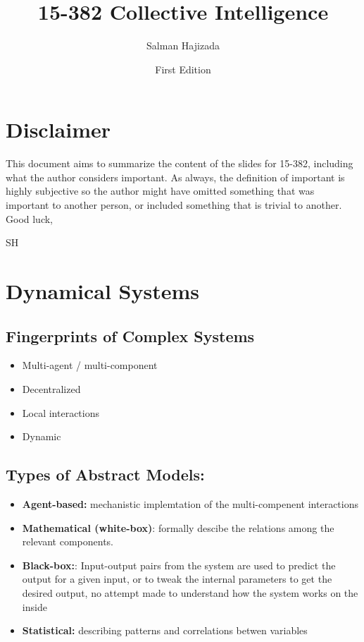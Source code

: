 \documentclass{report}
\title{15-382 Collective Intelligence}
\date{First Edition}
\author{Salman Hajizada}
\begin{document}
\maketitle

\setcounter{chapter}{-1}
\chapter*{Disclaimer}
This document aims to summarize the content of the slides for 15-382, including 
what the author considers important. As always, the definition of important is 
highly subjective so the author might have omitted something that was 
important to another person, or included something that is trivial to another.
\\

Good luck,

SH
\chapter*{Dynamical Systems}

\section*{Fingerprints of Complex Systems}

\begin{itemize}
    \item Multi-agent / multi-component 
    \item Decentralized 
    \item Local interactions 
    \item Dynamic
\end{itemize}

\section*{Types of Abstract Models:}

\begin{itemize}
    \item \textbf{Agent-based:} mechanistic implemtation of the multi-compenent interactions
    \item \textbf{Mathematical (white-box)}: formally descibe the relations among the relevant components. 
    \item \textbf{Black-box:}: Input-output pairs from the system are used to predict the output for a given input, or to tweak the internal parameters to get the desired output, no attempt made to understand how the system works on the inside
    \item \textbf{Statistical:} describing patterns and correlations betwen variables
\end{itemize}
\end{document}
